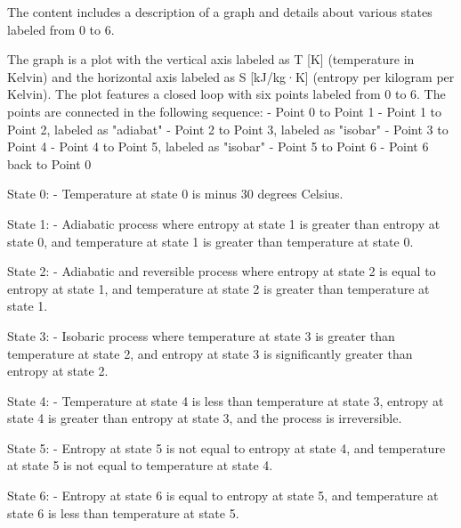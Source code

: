 The content includes a description of a graph and details about various states labeled from 0 to 6.

The graph is a plot with the vertical axis labeled as T [K] (temperature in Kelvin) and the horizontal axis labeled as S [kJ/kg·K] (entropy per kilogram per Kelvin). The plot features a closed loop with six points labeled from 0 to 6. The points are connected in the following sequence:
- Point 0 to Point 1
- Point 1 to Point 2, labeled as "adiabat"
- Point 2 to Point 3, labeled as "isobar"
- Point 3 to Point 4
- Point 4 to Point 5, labeled as "isobar"
- Point 5 to Point 6
- Point 6 back to Point 0

State 0:
- Temperature at state 0 is minus 30 degrees Celsius.

State 1:
- Adiabatic process where entropy at state 1 is greater than entropy at state 0, and temperature at state 1 is greater than temperature at state 0.

State 2:
- Adiabatic and reversible process where entropy at state 2 is equal to entropy at state 1, and temperature at state 2 is greater than temperature at state 1.

State 3:
- Isobaric process where temperature at state 3 is greater than temperature at state 2, and entropy at state 3 is significantly greater than entropy at state 2.

State 4:
- Temperature at state 4 is less than temperature at state 3, entropy at state 4 is greater than entropy at state 3, and the process is irreversible.

State 5:
- Entropy at state 5 is not equal to entropy at state 4, and temperature at state 5 is not equal to temperature at state 4.

State 6:
- Entropy at state 6 is equal to entropy at state 5, and temperature at state 6 is less than temperature at state 5.